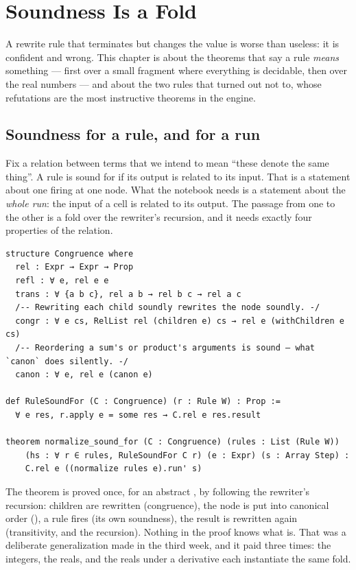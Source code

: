 \chapter{Soundness Is a Fold}\label{ch:sound}

A rewrite rule that terminates but changes the value is worse than useless: it is confident and
wrong. This chapter is about the theorems that say a rule \emph{means} something --- first over a
small fragment where everything is decidable, then over the real numbers --- and about the two
rules that turned out not to, whose refutations are the most instructive theorems in the engine.

\section{Soundness for a rule, and for a run}

Fix a relation  between terms that we intend to mean ``these denote the same thing''. A
rule is sound for  if its output is related to its input. That is a statement about one
firing at one node. What the notebook needs is a statement about the \emph{whole run}: the input
of a cell is related to its output. The passage from one to the other is a fold over the
rewriter's recursion, and it needs exactly four properties of the relation.

\begin{verbatim}
structure Congruence where
  rel : Expr → Expr → Prop
  refl : ∀ e, rel e e
  trans : ∀ {a b c}, rel a b → rel b c → rel a c
  /-- Rewriting each child soundly rewrites the node soundly. -/
  congr : ∀ e cs, RelList rel (children e) cs → rel e (withChildren e cs)
  /-- Reordering a sum's or product's arguments is sound — what `canon` does silently. -/
  canon : ∀ e, rel e (canon e)

def RuleSoundFor (C : Congruence) (r : Rule W) : Prop :=
  ∀ e res, r.apply e = some res → C.rel e res.result

theorem normalize_sound_for (C : Congruence) (rules : List (Rule W))
    (hs : ∀ r ∈ rules, RuleSoundFor C r) (e : Expr) (s : Array Step) :
    C.rel e ((normalize rules e).run' s)
\end{verbatim}

The theorem is proved once, for an abstract , by following the rewriter's
recursion: children are rewritten (congruence), the node is put into canonical order
(), a rule fires (its own soundness), the result is rewritten again (transitivity,
and the recursion). Nothing in the proof knows what  is. That was a deliberate
generalization made in the third week, and it paid three times: the integers, the reals, and
the reals under a derivative each instantiate the same fold.

